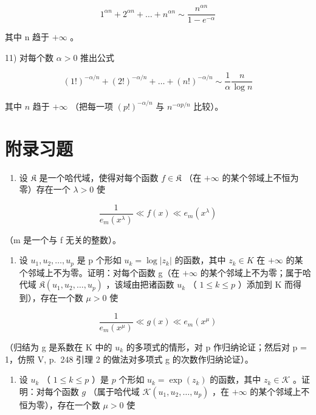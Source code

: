 \[
1 ^ {\alpha n} + 2 ^ {\alpha n} + \dots + n ^ {\alpha n} \sim \frac {n ^ {\alpha n}}{1 - e ^ {- \alpha}}
\]

其中 n 趋于 \(+\infty\) 。

11) 对每个数 \(\alpha > 0\) 推出公式

\[
(1!) ^ {- \alpha / n} + (2!) ^ {- \alpha / n} + \dots + (n!) ^ {- \alpha / n} \sim \frac {1}{\alpha} \frac {n}{\log n}
\]

其中 \(n\) 趋于 \(+\infty\) （把每一项 \((p!)^{-\alpha / n}\) 与 \(n^{-\alpha p / n}\) 比较）。

\section*{附录习题}
{}

\begin{enumerate}
\def\labelenumi{\arabic{enumi})}
\tightlist
\item
  设 \(\mathfrak{K}\) 是一个哈代域，使得对每个函数 \(f\in \mathfrak{K}\) （在 \(+\infty\) 的某个邻域上不恒为零）存在一个 \(\lambda >0\) 使
\end{enumerate}

\[
\frac {1}{e _ {m} (x ^ {\lambda})} \ll f (x) \ll e _ {m} (x ^ {\lambda})
\]

（m 是一个与 f 无关的整数）。

\begin{enumerate}
\def\labelenumi{\alph{enumi})}
\tightlist
\item
  设 \(u_{1}, u_{2}, \ldots, u_{p}\) 是 p 个形如 \(u_{k} = \log |z_{k}|\) 的函数，其中 \(z_{k} \in K\) 在 \(+\infty\) 的某个邻域上不为零。证明：对每个函数 g（在 \(+\infty\) 的某个邻域上不为零；属于哈代域 \(\mathfrak{K}(u_{1}, u_{2}, \ldots, u_{p})\) ，该域由把诸函数 \(u_{k}\) （ \(1 \leqslant k \leqslant p\) ）添加到 K 而得到），存在一个数 \(\mu > 0\) 使
\end{enumerate}

\[
\frac {1}{e _ {m} (x ^ {\mu})} \ll g (x) \ll e _ {m} (x ^ {\mu})
\]

（归结为 g 是系数在 K 中的 \(u_{k}\) 的多项式的情形，对 p 作归纳论证；然后对 p = 1，仿照 V, p.~248 引理 2 的做法对多项式 g 的次数作归纳论证）。

\begin{enumerate}
\def\labelenumi{\alph{enumi})}
\setcounter{enumi}{1}
\tightlist
\item
  设 \(u_{k}\) （ \(1 \leqslant k \leqslant p\) ）是 \(p\) 个形如 \(u_{k} = \exp(z_{k})\) 的函数，其中 \(z_{k} \in \mathcal{K}\) 。证明：对每个函数 \(g\) （属于哈代域 \(\mathcal{K}(u_{1}, u_{2}, \ldots, u_{p})\) ，在 \(+\infty\) 的某个邻域上不恒为零），存在一个数 \(\mu > 0\) 使
\end{enumerate}

